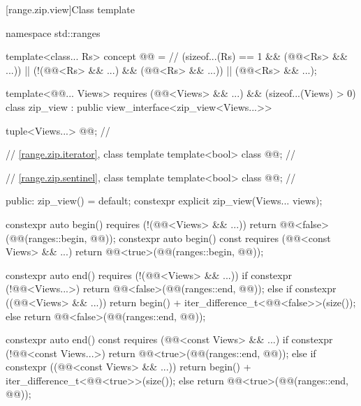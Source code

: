 [range.zip.view]{Class template }

%
%
%
\begin{codeblock}
namespace std::ranges {
  template<class... Rs>
  concept @@ =                             // \expos
    (sizeof...(Rs) == 1 && (@@<Rs> && ...)) ||
    (!(@@<Rs> && ...) && (@@<Rs> && ...)) ||
    (@@<Rs> && ...);

  template<@@... Views>
    requires (@@<Views> && ...) && (sizeof...(Views) > 0)
  class zip_view : public view_interface<zip_view<Views...>> {
    tuple<Views...> @@;             // \expos

    // \ref{range.zip.iterator}, class template 
    template<bool> class @@;      // \expos

    // \ref{range.zip.sentinel}, class template 
    template<bool> class @@;      // \expos

  public:
    zip_view() = default;
    constexpr explicit zip_view(Views... views);

    constexpr auto begin() requires (!(@@<Views> && ...)) {
      return @@<false>(@@(ranges::begin, @@));
    }
    constexpr auto begin() const requires (@@<const Views> && ...) {
      return @@<true>(@@(ranges::begin, @@));
    }

    constexpr auto end() requires (!(@@<Views> && ...)) {
      if constexpr (!@@<Views...>) {
        return @@<false>(@@(ranges::end, @@));
      } else if constexpr ((@@<Views> && ...)) {
        return begin() + iter_difference_t<@@<false>>(size());
      } else {
        return @@<false>(@@(ranges::end, @@));
      }
    }

    constexpr auto end() const requires (@@<const Views> && ...) {
      if constexpr (!@@<const Views...>) {
        return @@<true>(@@(ranges::end, @@));
      } else if constexpr ((@@<const Views> && ...)) {
        return begin() + iter_difference_t<@@<true>>(size());
      } else {
        return @@<true>(@@(ranges::end, @@));
      }
    }

}}
\end{codeblock}
